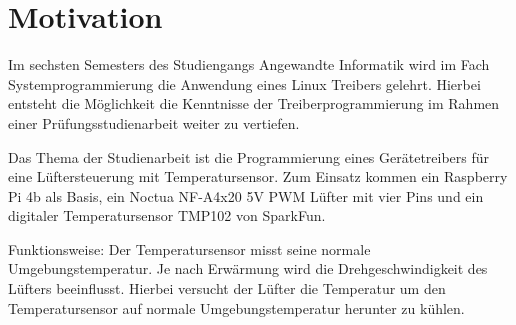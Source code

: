 \section{Motivation}
Im sechsten Semesters des Studiengangs Angewandte Informatik wird im Fach Systemprogrammierung die Anwendung eines Linux Treibers gelehrt.
Hierbei entsteht die Möglichkeit die Kenntnisse der Treiberprogrammierung im Rahmen einer Prüfungsstudienarbeit weiter zu vertiefen.

Das Thema der Studienarbeit ist die Programmierung eines Gerätetreibers für eine Lüftersteuerung mit Temperatursensor.
Zum Einsatz kommen ein Raspberry Pi 4b als Basis, ein Noctua NF-A4x20 5V PWM Lüfter mit vier Pins und ein digitaler Temperatursensor TMP102 von SparkFun.

Funktionsweise:
Der Temperatursensor misst seine normale Umgebungstemperatur.
Je nach Erwärmung wird die Drehgeschwindigkeit des Lüfters beeinflusst.
Hierbei versucht der Lüfter die Temperatur um den Temperatursensor auf normale Umgebungstemperatur herunter zu kühlen.

